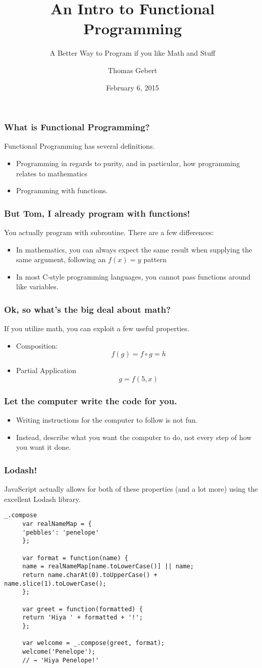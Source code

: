 \documentclass{beamer}
\title{An Intro to Functional Programming}
\subtitle{A Better Way to Program if you like Math and Stuff}
\author{Thomas Gebert}
\date{February 6, 2015}
\begin{document}
  \frame{\titlepage}
  \begin{frame}
  	\frametitle{What is Functional Programming?} 
  	Functional Programming has several definitions. 
	  \begin{itemize}
	    \item Programming in regards to purity, and in particular, how programming relates to mathematics
	    \item Programming with functions.
	  \end{itemize}
    
  \end{frame}
  \begin{frame}
  	\frametitle{But Tom, I already program with functions!}
  	You actually program with subroutine.  There are a few differences: 
  	\begin{itemize}
  		\item  In mathematics, you can always expect the same result when supplying the same argument, following an $ f(x) = y $ pattern
  		\item In most C-style programming languages, you cannot pass functions around like variables.
  	\end{itemize}
  \end{frame}
  \begin{frame}
  	\frametitle{Ok, so what's the big deal about math?}
  	If you utilize math, you can exploit a few useful properties. 
  	\begin{itemize}
  		\item Composition: $$ f\left(g\right) = f \circ g = h $$
	  	\item Partial Application $$g = f\left(5,x\right)$$
  	\end{itemize}
  \end{frame}
\begin{frame}
	\frametitle{Let the computer write the code for you.}
	\begin{itemize}
		\item Writing instructions for the computer to follow is not fun.
		\item Instead, describe what you want the computer to do, not every step of how you want it done. 
	\end{itemize}
\end{frame}
\begin{frame}[fragile]
	\frametitle{Lodash!}
	JavaScript actually allows for both of these properties (and a lot more) using the excellent Lodash library.
	\begin{lstlisting}[basicstyle=\tiny]
	 _.compose
	 var realNameMap = {
	 'pebbles': 'penelope'
	 };
	 
	 var format = function(name) {
	 name = realNameMap[name.toLowerCase()] || name;
	 return name.charAt(0).toUpperCase() + name.slice(1).toLowerCase();
	 };
	 
	 var greet = function(formatted) {
	 return 'Hiya ' + formatted + '!';
	 };
	 
	 var welcome = _.compose(greet, format);
	 welcome('Penelope');
	 // → 'Hiya Penelope!'
	\end{lstlisting}
    
\end{frame}
\end{document}
